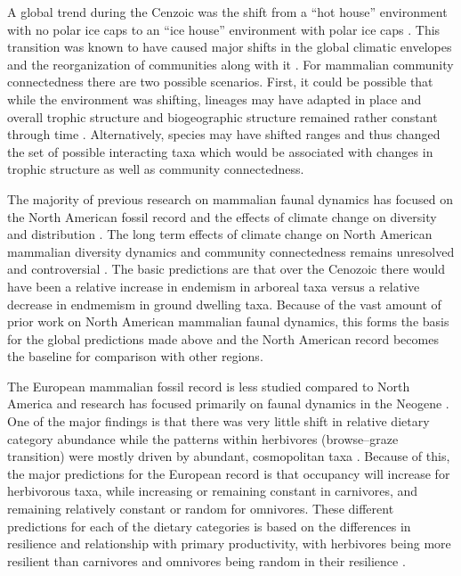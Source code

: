 \documentclass[12pt,letterpaper]{article}
\begin{document}
A global trend during the Cenzoic was the shift from a ``hot house'' environment with no polar ice caps to an ``ice house'' environment with polar ice caps \citep{Zachos2008,Zachos2001}. This transition was known to have caused major shifts in the global climatic envelopes and the reorganization of communities along with it \citep{Janis1993a,Fortelius2002,Blois2009,Alroy2000g,Figueirido2012}. For mammalian community connectedness there are two possible scenarios. First, it could be possible that while the environment was shifting, lineages may have adapted in place and overall trophic structure and biogeographic structure remained rather constant through time \citep{Jernvall2004}. Alternatively, species may have shifted ranges and thus changed the set of possible interacting taxa which would be associated with changes in trophic structure as well as community connectedness.

The majority of previous research on mammalian faunal dynamics has focused on the North American fossil record and the effects of climate change on diversity and distribution \citep{Alroy2000g,Alroy1996a,Alroy1998,Barnosky2001a,Simpson1944,Simpson1953,Badgley2013,Blois2009,Figueirido2012,Gunnell1995,Hadly2001}. The long term effects of climate change on North American mammalian diversity dynamics and community connectedness remains unresolved and controversial \citep{Alroy2000g,Blois2009,Figueirido2012,Barnosky2001a}. The basic predictions are that over the Cenozoic there would have been a relative increase in endemism in arboreal taxa versus a relative decrease in endmemism in ground dwelling taxa. Because of the vast amount of prior work on North American mammalian faunal dynamics, this forms the basis for the global predictions made above and the North American record becomes the baseline for comparison with other regions.

The European mammalian fossil record is less studied compared to North America and research has focused primarily on faunal dynamics in the Neogene \citep{Jernvall2002,Jernvall2004,Liow2008,Raia2006,Raia2005,Raia2011c}. One of the major findings is that there was very little shift in relative dietary category abundance \citep{Jernvall2004} while the patterns within herbivores (browse--graze transition) were mostly driven by abundant, cosmopolitan taxa \citep{Jernvall2002}. Because of this, the major predictions for the European record is that occupancy will increase for herbivorous taxa, while increasing or remaining constant in carnivores, and remaining relatively constant or random for omnivores. These different predictions for each of the dietary categories is based on the differences in resilience and relationship with primary productivity, with herbivores being more resilient than carnivores and omnivores being random in their resilience \citep{Jernvall2004}. 
\end{document}
